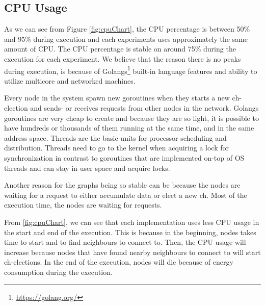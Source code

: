 \documentclass[USenglish]{uit-thesis}
\begin{document}
\newpage

\subsection{CPU Usage}
As we can see from Figure \ref{fig:cpuChart}, the CPU percentage is between 50\% and 95\% during execution and each experiments uses approximately the same amount of CPU.
The CPU percentage is stable on around 75\% during the execution for each experiment. We believe that the reason there is no peaks during execution, is because of Golangs\footnote{\url{https://golang.org/}} built-in language features and ability to utilize multicore and networked machines.

Every node in the system spawn new goroutines when they starts a new \gls{ch}-election and sends- or receives requests from other nodes in the network.
Golangs goroutines are very cheap to create and because they are so light, it is possible to have hundreds or thousands of them running at the same time, and in the same address space. Threads are the basic units for processor scheduling and distribution. Threads need to go to the kernel when acquiring a lock for synchronization in contrast to goroutines that are implemented on-top of OS threads and can stay in user space and acquire locks.

Another reason for the graphs being so stable can be because the nodes are waiting for a request to either accumulate data or elect a new \gls{ch}. Most of the execution time, the nodes are waiting for requests.

From \autoref{fig:cpuChart}, we can see that each implementation uses less CPU usage in the start and end of the execution. This is because in the beginning, nodes takes time to start and to find neighbours to connect to. Then, the CPU usage will increase because nodes that have found nearby neighbours to connect to will start \gls{ch}-elections.
In the end of the execution, nodes will die because of energy consumption during the execution.

\end{document}
